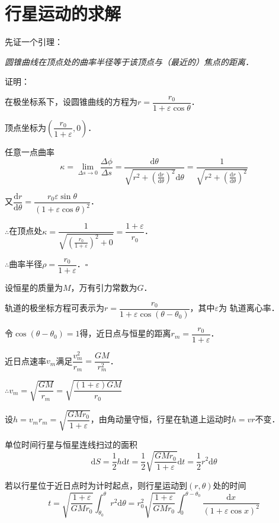 \documentclass[UTF8,fontset=none,linespread=1.2]{ctexart}
\newcommand{\upd}{\mathrm{d}}
\begin{document}
\section*{行星运动的求解}
\noindent 先证一个引理：

\textit{圆锥曲线在顶点处的曲率半径等于该顶点与（最近的）焦点的距离．}

\noindent 证明：

在极坐标系下，设圆锥曲线的方程为$r=\dfrac{r_0}{1+\varepsilon\cos\theta}$．

顶点坐标为$\left(\dfrac{r_0}{1+\varepsilon},0\right)$．

任意一点曲率$$\kappa=\lim_{\Delta s\to 0}\dfrac{\Delta\phi}{\Delta s}
=\dfrac{\upd\theta}{\sqrt{r^2+\left(\frac{\upd r}{\upd\theta}\right)^2}\upd\theta}
=\dfrac{1}{\sqrt{r^2+\left(\frac{\upd r}{\upd\theta}\right)^2}}$$

又$\dfrac{\upd r}{\upd\theta}=\dfrac{r_0\varepsilon\sin\theta}{(1+\varepsilon\cos\theta)^2}$．

$\therefore$在顶点处$\kappa=\dfrac{1}{\sqrt{\left(\frac{r_0}{1+\varepsilon}\right)^2+0}}=\dfrac{1+\varepsilon}{r_0}$．

$\therefore$曲率半径$\rho=\dfrac{r_0}{1+\varepsilon}$．\hfill$\square$

\vspace{4ex}
设恒星的质量为$M$，万有引力常数为$G$．

轨道的极坐标方程可表示为$r=\dfrac{r_0}{1+\varepsilon\cos(\theta-\theta_0)}$，其中$\varepsilon$为
轨道离心率．

令$\cos(\theta-\theta_0)=1$得，近日点与恒星的距离$r_m=\dfrac{r_0}{1+\varepsilon}$．

近日点速率$v_m$满足$\dfrac{v_m^2}{r_m}=\dfrac{GM}{r_m^2}$．

$\therefore v_m=\sqrt{\dfrac{GM}{r_m}}=\sqrt{\dfrac{(1+\varepsilon)GM}{r_0}}$

设$h=v_mr_m=\sqrt{\dfrac{GMr_0}{1+\varepsilon}}$，由角动量守恒，行星在轨道上运动时$h=vr$不变．

单位时间行星与恒星连线扫过的面积$$\upd S=\dfrac12h\upd t=\dfrac12\sqrt{\dfrac{GMr_0}{1+\varepsilon}}\upd t=\dfrac12r^2\upd\theta$$

若以行星位于近日点时为计时起点，则行星运动到$(r,\theta)$处的时间$$t=\sqrt{\dfrac{1+\varepsilon}{GMr_0}}\int_{\theta_0}^{\theta}r^2\upd \theta=r_0^2\sqrt{\dfrac{1+\varepsilon}{GMr_0}}\int_0^{\theta-\theta_0}\dfrac{\upd x}{(1+\varepsilon\cos x)^2}$$
\end{document}
